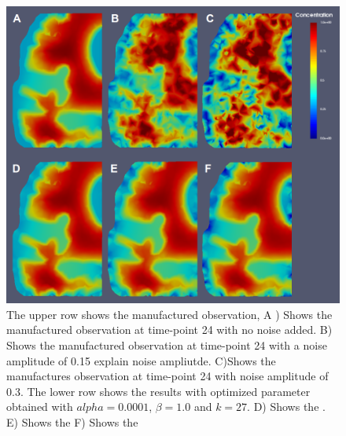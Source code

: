 \documentclass[11pt,a4paper]{article}
\begin{document}
\begin{figure}
\centering
\includegraphics[scale=0.4]{27-24-hours-scale-0-1.png}
\caption{The upper row shows the manufactured observation, A ) Shows the manufactured observation at time-point 24 with no noise added. B) Shows the manufactured observation at time-point 24 with a noise amplitude of 0.15 {\color{red} explain noise ampliutde}. C)Shows the manufactures observation at time-point 24 with noise amplitude of 0.3. The lower row shows the results with optimized parameter obtained with $alpha=0.0001$, $\beta=1.0$ and $k=27$. D) Shows the  . E)  Shows the  F)  Shows the  }
\end{figure}
 
 
 


\newpage 
{}
\end{document}
